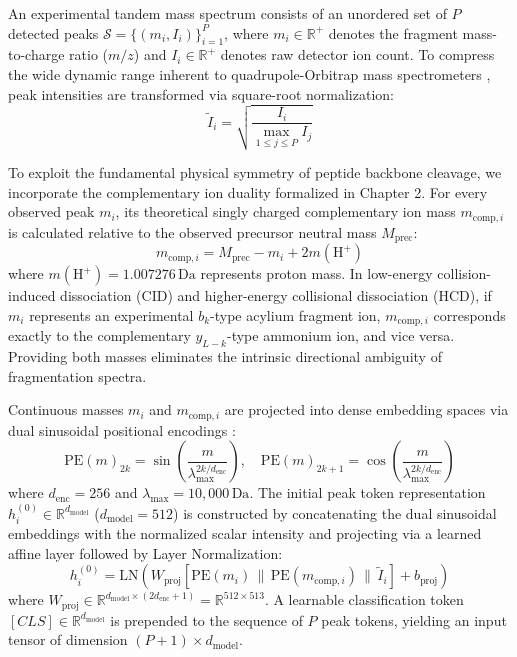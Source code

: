 An experimental tandem mass spectrum consists of an unordered set of $P$ detected peaks $\mathcal{S} = \{ (m_i, I_i) \}_{i=1}^P$, where $m_i \in \mathbb{R}^+$ denotes the fragment mass-to-charge ratio ($m/z$) and $I_i \in \mathbb{R}^+$ denotes raw detector ion count. To compress the wide dynamic range inherent to quadrupole-Orbitrap mass spectrometers \citep{Makarov2000, Zubarev2007}, peak intensities are transformed via square-root normalization:
\begin{equation}
\tilde{I}_i = \sqrt{\frac{I_i}{\max_{1 \le j \le P} I_j}}
\label{eq:intensity_normalization}
\end{equation}

To exploit the fundamental physical symmetry of peptide backbone cleavage, we incorporate the complementary ion duality formalized in Chapter 2. For every observed peak $m_i$, its theoretical singly charged complementary ion mass $m_{\text{comp}, i}$ is calculated relative to the observed precursor neutral mass $M_{\text{prec}}$:
\begin{equation}
m_{\text{comp}, i} = M_{\text{prec}} - m_i + 2 m(\text{H}^+)
\label{eq:comp_ion_formula}
\end{equation}
where $m(\text{H}^+) = 1.007276\,\text{Da}$ represents proton mass. In low-energy collision-induced dissociation (CID) and higher-energy collisional dissociation (HCD), if $m_i$ represents an experimental $b_k$-type acylium fragment ion, $m_{\text{comp}, i}$ corresponds exactly to the complementary $y_{L-k}$-type ammonium ion, and vice versa. Providing both masses eliminates the intrinsic directional ambiguity of fragmentation spectra.

Continuous masses $m_i$ and $m_{\text{comp}, i}$ are projected into dense embedding spaces via dual sinusoidal positional encodings \citep{Vaswani2017}:
\begin{equation}
\text{PE}(m)_{2k} = \sin\left( \frac{m}{\lambda_{\max}^{2k / d_{\text{enc}}}} \right), \quad \text{PE}(m)_{2k+1} = \cos\left( \frac{m}{\lambda_{\max}^{2k / d_{\text{enc}}}} \right)
\label{eq:sinusoidal_pe}
\end{equation}
where $d_{\text{enc}} = 256$ and $\lambda_{\max} = 10{,}000\,\text{Da}$. The initial peak token representation $h_i^{(0)} \in \mathbb{R}^{d_{\text{model}}}$ ($d_{\text{model}} = 512$) is constructed by concatenating the dual sinusoidal embeddings with the normalized scalar intensity and projecting via a learned affine layer followed by Layer Normalization:
\begin{equation}
h_i^{(0)} = \text{LN}\left( W_{\text{proj}} \left[ \text{PE}(m_i) \,\|\, \text{PE}(m_{\text{comp}, i}) \,\|\, \tilde{I}_i \right] + b_{\text{proj}} \right)
\label{eq:peak_projection}
\end{equation}
where $W_{\text{proj}} \in \mathbb{R}^{d_{\text{model}} \times (2 d_{\text{enc}} + 1)} = \mathbb{R}^{512 \times 513}$. A learnable classification token $[CLS] \in \mathbb{R}^{d_{\text{model}}}$ is prepended to the sequence of $P$ peak tokens, yielding an input tensor of dimension $(P+1) \times d_{\text{model}}$.

